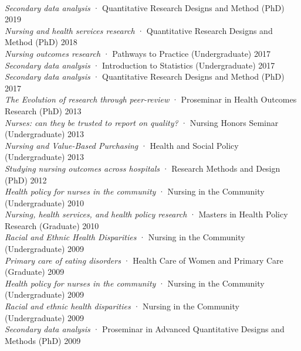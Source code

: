 \documentclass[10pt,]{article}
\begin{document}
{{{{{{{{{{{{{{{{{{{{{{{{{{{{{{\vspace{2mm} 
\\
{\textit{Secondary data analysis}} · Quantitative Research Designs and Method {\small{(PhD)}} \hfill 2019\\
{\textit{Nursing and health services research}} · Quantitative Research Designs and Method {\small{(PhD)}} \hfill 2018\\
{\textit{Nursing outcomes research}} · Pathways to Practice {\small{(Undergraduate)}} \hfill 2017	\\
{\textit{Secondary data analysis}} · Introduction to Statistics {\small{(Undergraduate)}} \hfill 2017\\
{\textit{Secondary data analysis}} · Quantitative Research Designs and Method {\small{(PhD)}} \hfill 2017\\
{\textit{The Evolution of research through peer-review} · Proseminar in Health Outcomes Research {\small{(PhD)}} \hfill 2013\\
{\textit{Nurses: can they be trusted to report on quality?} · Nursing Honors Seminar {\small{(Undergraduate)}} \hfill 2013\\
{\textit{Nursing and Value-Based Purchasing} · Health and Social Policy {\small{(Undergraduate)}} \hfill 2013\\
{\textit{Studying nursing outcomes across hospitals} · Research Methods and Design {\small{(PhD)}} \hfill 2012\\
{\textit{Health policy for nurses in the community} · Nursing in the Community {\small{(Undergraduate)}} \hfill 2010\\
{\textit{Nursing, health services, and health policy research} · Masters in Health Policy Research {\small{(Graduate)}} \hfill 2010\\
{\textit{Racial and Ethnic Health Disparities} · Nursing in the Community {\small{(Undergraduate)}} \hfill 2009\\
{\textit{Primary care of eating disorders} · Health Care of Women and Primary Care {\small{(Graduate)}} \hfill 2009\\
{\textit{Health policy for nurses in the community} · Nursing in the Community {\small{(Undergraduate)}} \hfill 2009\\
{\textit{Racial and ethnic health disparities} · Nursing in the Community {\small{(Undergraduate)}} \hfill 2009\\
{\textit{Secondary data analysis} · Proseminar in Advanced Quantitative Designs and Methods {\small{(PhD)}} \hfill 2009\\
}}}}}}}}}}}}}}}}}}}}}}}}}}}}}}}}}}}}}}}}}
\end{document}
